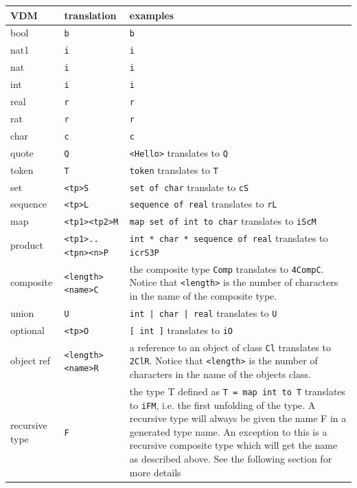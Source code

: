 \documentclass[\pformat,12pt]{article}
\begin{document}
\begin{longtable}{|l|l|p{7cm}|} \hline
  VDM            & translation   & examples \\ \hline \hline
\endhead
\hline
\endfoot
\hline
  bool           & \verb+b+      & \verb+b+ \\ \hline
  nat1           & \verb+i+      & \verb+i+ \\ 
  nat            & \verb+i+      & \verb+i+ \\ 
  int            & \verb+i+      & \verb+i+ \\ \hline
  real           & \verb+r+      & \verb+r+ \\ 
  rat            & \verb+r+      & \verb+r+ \\ \hline
  char           & \verb+c+      & \verb+c+ \\ \hline
  quote          & \verb+Q+      & \verb+<Hello>+ translates to \verb+Q+  \\ \hline
  token          & \verb+T+      & \verb+token+ translates to \verb+T+     \\ \hline
  set            & \verb+<tp>S+  & \verb+set of char+ translate to \verb+cS+       \\ \hline
  sequence       & \verb+<tp>L+  & \verb+sequence of real+ translates to \verb+rL+  \\ \hline
  map            & \verb+<tp1><tp2>M+ & \verb+map set of int to char+ translates to \verb+iScM+ \\ \hline
  product        & \verb+<tp1>..<tpn><n>P+ & \verb+int * char * sequence of real+ translates to \verb+icrS3P+ \\ \hline
  composite      & \verb+<length><name>C+ & the composite type \verb+Comp+ translates to \verb+4CompC+. 
                                            Notice that \verb+<length>+ is the number of characters in the name of the composite type. \\ \hline 
  union          & \verb+U+ & \verb+int | char | real+ translates to \verb+U+ \\ \hline
  optional       & \verb+<tp>O+ & \verb+[ int ]+ translates to \verb+iO+ \\ \hline
  object ref     & \verb+<length><name>R+ & a reference to an object of class \verb+Cl+ translates to \verb+2ClR+.
                                            Notice that \verb+<length>+ is the number of characters in the name of the objects class. \\ \hline
  recursive type & \verb+F+ & the type T defined as \verb+T = map int to T+ translates to \verb+iFM+, 
                              i.e. the first unfolding of the type. A recursive type will always be given
                              the name F in a generated type name. An exception to this is a recursive composite
                              type which will get the name as described above. See the following section
                              for more details\\ \hline
\end{longtable}
\end{document}

